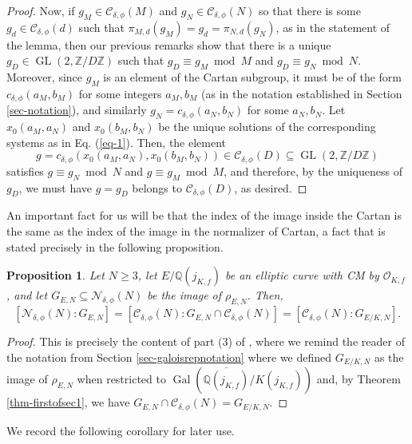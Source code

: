 \documentclass[11pt]{amsart}
\newtheorem{prop}[defn]{Proposition}
\theoremstyle{definition}
\newcommand{\Q}{\mathbb{Q}}
\newcommand{\Z}{\mathbb{Z}}
\newcommand{\Of}{\mathcal{O}_{K,f}}
\newcommand{\Gal}{\operatorname{Gal}}
\newcommand{\GL}{\operatorname{GL}}
\begin{document}
\begin{proof}
Now, if  $g_{M} \in \mathcal{C}_{\delta, \phi}(M)$ and $g_{N} \in \mathcal{C}_{\delta, \phi}(N)$ so that there is some $g_d \in \mathcal{C}_{\delta, \phi}(d)$ such that $\pi_{M,d}(g_M) = g_d = \pi_{N,d}(g_N)$, as in the statement of the lemma, then our previous remarks show that there is a unique $g_D\in \GL(2,\Z/D\Z)$ such that $g_D\equiv g_M\bmod M$ and $g_D\equiv g_N\bmod N$. Moreover, since $g_M$ is an element of the Cartan subgroup, it must be of the form $c_{\delta,\phi}(a_M,b_M)$ for some integers $a_M,b_M$ (as in the notation established in Section \ref{sec-notation}), and similarly $g_N= c_{\delta,\phi}(a_N,b_N)$ for some $a_N,b_N$. Let $x_0(a_M,a_N)$ and $x_0(b_M,b_N)$ be the unique solutions of the corresponding systems as in Eq. (\ref{eq-1}).  Then, the element
$$g=c_{\delta,\phi}(x_0(a_M,a_N),x_0(b_M,b_N))\in  \mathcal{C}_{\delta, \phi}(D)\subseteq \GL(2,\Z/D\Z)$$
satisfies $g\equiv g_N \bmod N$ and $g\equiv g_M\bmod M$, and therefore, by the uniqueness of $g_D$, we must have $g=g_D$ belongs to $\mathcal{C}_{\delta, \phi}(D)$, as desired. 
 \end{proof}


An important fact for us will be that the index of the image inside the Cartan is the same as the index of the image in the normalizer of Cartan, a fact that is stated precisely in the following proposition.

\begin{prop}\label{prop-sameindex}
	Let $N\geq 3$, let $E/\Q(j_{K,f})$ be an elliptic curve with CM by $\Of$, and let $G_{E,N}\subseteq \mathcal{N}_{\delta, \phi}(N)$ be the image of $\rho_{E,N}$. Then,
	$$[\mathcal{N}_{\delta, \phi}(N):G_{E,N}] = [\mathcal{C}_{\delta, \phi}(N):G_{E,N}\cap \mathcal{C}_{\delta, \phi}(N)]=[\mathcal{C}_{\delta, \phi}(N):G_{E/K,N}].$$
\end{prop}
\begin{proof}
	This is precisely the content of part (3) of \cite[Theorem 6.3]{lozano-galoiscm}, where we remind the reader of the notation from Section \ref{sec-galoisrepnotation} where we defined $G_{E/K,N}$ as the image of $\rho_{E,N}$ when restricted to $\Gal(\overline{\Q(j_{K,f})}/K(j_{K,f}))$ and, by Theorem \ref{thm-firstofsec1}, we have $G_{E,N}\cap \mathcal{C}_{\delta,\phi}(N)=G_{E/K,N}$.
\end{proof}

We record the following corollary for later use.
\end{document}
